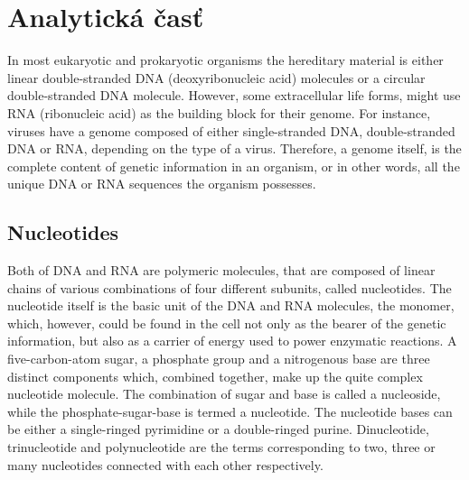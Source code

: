 
\chapter{Analytická časť}

In most eukaryotic and prokaryotic organisms the hereditary material is either linear double-stranded DNA (deoxyribonucleic acid) molecules or a circular double-stranded DNA molecule. However, some extracellular life forms, might use RNA (ribonucleic acid) as the building block for their genome. For instance, viruses have a genome composed of either single-stranded DNA, double-stranded DNA or RNA, depending on the type of a virus. Therefore, a genome itself, is the complete content of genetic information in an organism, or in other words, all the unique DNA or RNA sequences the organism possesses. 
\section{Nucleotides}

Both of DNA and RNA  are polymeric molecules, that are composed of linear chains of various combinations of four different subunits, called nucleotides. The nucleotide itself is the basic unit of the DNA and RNA molecules, the monomer, which, however, could be found in the cell not only as the bearer of the genetic information, but also as a carrier of energy used to power enzymatic reactions. A five-carbon-atom sugar, a phosphate group and a nitrogenous base are three distinct components which, combined together, make up the quite complex nucleotide molecule. The combination of sugar and base is called a nucleoside, while the phosphate-sugar-base is termed a nucleotide. The nucleotide bases can be either a single-ringed pyrimidine or a double-ringed purine. Dinucleotide, trinucleotide and polynucleotide are the terms corresponding to two, three or many nucleotides connected with each other respectively.


